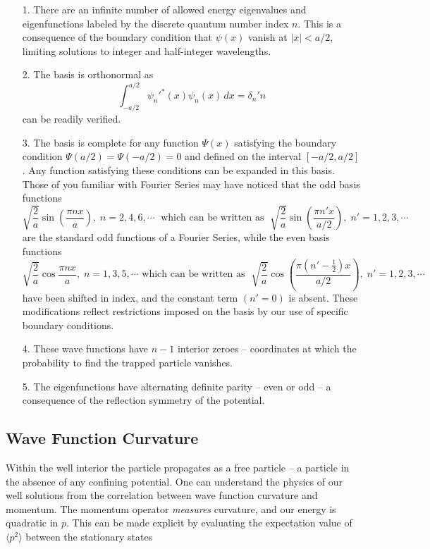 \begin{itemize}
  \item[1.] There are an infinite number of allowed energy eigenvalues and
    eigenfunctions labeled by the discrete quantum number index $n$. This
    is a consequence of the boundary condition that $\psi(x)$ vanish at $|x|
    < a/2$, limiting solutions to integer and half-integer wavelengths. 
  \item[2.] The basis is orthonormal as  \[ \int_{-a/2}^{a/2} \psi_n'^*(x)
    \psi_n(x) \, dx = \delta_n'n \] can be readily verified. 
  \item[3.] The basis is complete for any function $\Psi(x)$ satisfying the
    boundary condition $\Psi(a/2) = \Psi(-a/2) = 0$ and defined on the interval
    $[-a/2, a/2]$. Any function satisfying these conditions can be expanded in
    this basis. Those of you familiar with Fourier Series may have noticed that
    the odd basis functions \[ \sqrt{\frac{2}{a}}\sin \left( \frac{\pi n x}{a}
      \right), \; n = 2, 4, 6, \cdots \; \text{ which can be written as
      } \; \sqrt{\frac{2}{a}}\sin \left( \frac{\pi n' x}{a/2} \right), \; n' = 1, 2,
    3, \cdots \] \vspace{3px} are the standard odd functions of a Fourier Series, while the
    even basis functions \[ \sqrt{\frac{2}{a}}\cos \frac{\pi n x}{a}, \; n = 1, 3,
      5, \cdots \text{ which can be written as } \; \sqrt{\frac{2}{a}}\cos \left(
    \frac{\pi (n' - \frac{1}{2})x}{a/2}\right), \; n' = 1, 2, 3, \cdots \] \vspace{5px} have
    been shifted in index, and the constant term  $(n' = 0)$ is absent. These
    modifications reflect restrictions imposed on the basis by our use of
    specific boundary conditions.  
  \item[4.] These wave functions have  $n-1$ interior zeroes -- coordinates at
    which the probability to find the trapped particle vanishes. 
  \item[5.] The eigenfunctions have alternating definite parity -- even or odd
    -- a consequence of the reflection symmetry of the potential.
\end{itemize}

\subsection{Wave Function Curvature}

Within the well interior the particle propagates as a free particle --
a particle in the absence of any confining potential. One can understand the
physics of our well solutions from the correlation between wave function
curvature and momentum. The momentum operator \textit{measures} curvature, and
our energy is quadratic in $p$. This can be made explicit by evaluating the
expectation value of $\langle p^2 \rangle$ between the stationary states

